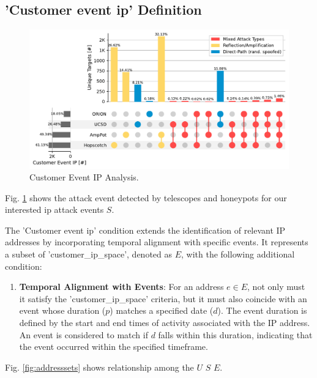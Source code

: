 \subsection*{'Customer event ip' Definition}
\begin{figure}[htbp]
    \centering
    \includegraphics[scale=0.4]{graphs/space_event.pdf}
    \caption{Customer Event IP Analysis.}
    \label{fig:customereventip}
\end{figure}
Fig. \ref{fig:customereventip} shows the attack event detected by telescopes and honeypots for our interested ip attack events $S$.


The 'Customer event ip' condition extends the identification of relevant IP addresses by incorporating temporal alignment with specific events. It represents a subset of 'customer\_ip\_space', denoted as $E$, with the following additional condition:

\begin{enumerate}
    \item \textbf{Temporal Alignment with Events}: For an address $e \in E$, not only must it satisfy the 'customer\_ip\_space' criteria, but it must also coincide with an event whose duration ($p$) matches a specified date ($d$). The event duration is defined by the start and end times of activity associated with the IP address. An event is considered to match if $d$ falls within this duration, indicating that the event occurred within the specified timeframe.
\end{enumerate}
Fig. \ref{fig:addresssets} shows relationship among the $U$ $S$ $E$.

